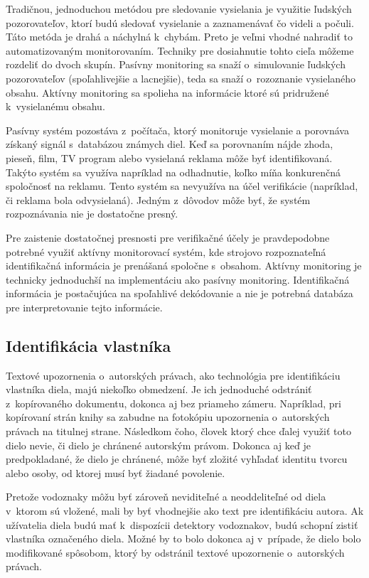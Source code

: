 Tradičnou, jednoduchou metódou pre sledovanie vysielania je využitie ľudských pozorovateľov, ktorí budú sledovať vysielanie a zaznamenávať čo videli a počuli. Táto metóda je drahá a náchylná k~chybám. Preto je veľmi vhodné nahradiť to automatizovaným monitorovaním. Techniky pre dosiahnutie tohto cieľa môžeme rozdeliť do dvoch skupín. Pasívny monitoring sa snaží o~simulovanie ľudských pozorovateľov (spoľahlivejšie a lacnejšie), teda sa snaží o~rozoznanie vysielaného obsahu. Aktívny monitoring sa spolieha na informácie ktoré sú pridružené k~vysielanému obsahu.

Pasívny systém pozostáva z~počítača, ktorý monitoruje vysielanie a porovnáva získaný signál s~databázou známych  diel. Keď sa porovnaním nájde zhoda, pieseň, film, TV program alebo vysielaná reklama môže byť identifikovaná. Takýto systém sa využíva napríklad na odhadnutie, koľko míňa konkurenčná spoločnosť na reklamu. Tento systém sa nevyužíva na účel verifikácie (napríklad, či reklama bola odvysielaná). Jedným z~dôvodov môže byť, že systém rozpoznávania nie je dostatočne presný.

Pre zaistenie dostatočnej presnosti pre verifikačné účely je pravdepodobne potrebné využiť aktívny monitorovací systém, kde strojovo rozpoznateľná identifikačná informácia je prenášaná spoločne s~obsahom. Aktívny monitoring je technicky jednoduchší na implementáciu ako pasívny monitoring. Identifikačná informácia je postačujúca na spoľahlivé dekódovanie a nie je potrebná databáza pre interpretovanie tejto informácie. \cite{Cox}

\subsection{Identifikácia vlastníka}
Textové upozornenia o~autorských právach, ako technológia pre identifikáciu vlastníka diela, majú niekoľko obmedzení. Je ich jednoduché odstrániť z~kopírovaného dokumentu, dokonca aj bez priameho zámeru. Napríklad, pri kopírovaní strán knihy sa zabudne na fotokópiu upozornenia o~autorských právach na titulnej strane. Následkom čoho, človek ktorý chce ďalej využiť toto dielo nevie, či dielo je chránené autorským právom. Dokonca aj keď je predpokladané, že dielo je chránené, môže byť zložité vyhľadať identitu tvorcu alebo osoby, od ktorej musí byť žiadané povolenie.

Pretože vodoznaky môžu byť zároveň neviditeľné a neoddeliteľné od diela v~ktorom sú vložené, mali by byť vhodnejšie ako text pre identifikáciu autora. Ak užívatelia diela budú mať k~dispozícii detektory vodoznakov, budú schopní zistiť vlastníka označeného diela. Možné by to bolo dokonca aj v~prípade, že dielo bolo modifikované spôsobom, ktorý by odstránil textové upozornenie o~autorských právach.

